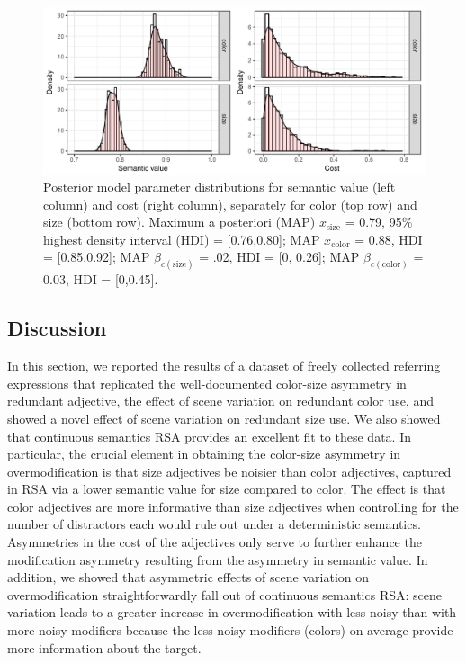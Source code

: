 \documentclass[11pt]{article}
\begin{document}
\begin{figure}
\centering
\includegraphics[width=\textwidth]{pics/exp1-paramposteriors}
\caption{Posterior model parameter distributions for semantic value (left column) and cost (right column), separately for color (top row) and size (bottom row). Maximum a posteriori (MAP)  $x_{\textrm{size}}$ = 0.79, 95\% highest density interval (HDI) = [0.76,0.80]; MAP $x_{\textrm{color}}$ = 0.88, HDI = [0.85,0.92]; MAP $\beta_{c(\textrm{size})}$ = .02, HDI = [0, 0.26]; MAP $\beta_{c(\textrm{color})}$ = 0.03, HDI = [0,0.45].}
\label{fig:modifierparamposteriors}
\end{figure}

\subsection{Discussion}
\label{sec:modifierdiscussion}

In this section, we reported the results of a dataset of freely collected referring expressions that replicated the well-documented color-size asymmetry in redundant adjective, the effect of scene variation on redundant color use, and showed a novel effect of scene variation on redundant size use. We also showed that continuous semantics RSA provides an excellent fit to these data. In particular, the crucial element in obtaining the color-size asymmetry in overmodification is that size adjectives be noisier than  color adjectives, captured in RSA via a lower semantic value for size compared to color. The effect is that color adjectives are more informative than size adjectives when controlling for the number of distractors each would rule out under a deterministic semantics. Asymmetries in the cost of the adjectives  only serve to further enhance the modification asymmetry resulting from the asymmetry in semantic value. In addition, we showed that asymmetric effects of scene variation on overmodification straightforwardly fall out of continuous semantics RSA: scene variation leads to a greater increase in overmodification with less noisy than with more noisy modifiers because the less noisy modifiers (colors) on average provide more information about the target.
\end{document}
